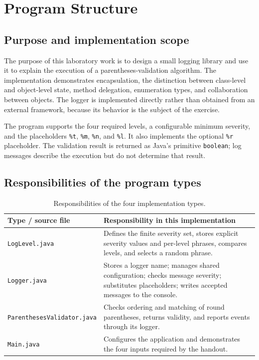 \documentclass[12pt,a4paper]{article}
\newcommand{\code}[1]{\texttt{#1}}
\begin{document}
\section{Program Structure}
\subsection{Purpose and implementation scope}
The purpose of this laboratory work is to design a small logging library and use it to explain the execution of a parentheses-validation algorithm. The implementation demonstrates encapsulation, the distinction between class-level and object-level state, method delegation, enumeration types, and collaboration between objects. The logger is implemented directly rather than obtained from an external framework, because its behavior is the subject of the exercise.

The program supports the four required levels, a configurable minimum severity, and the placeholders \code{\%t}, \code{\%m}, \code{\%n}, and \code{\%l}. It also implements the optional \code{\%r} placeholder. The validation result is returned as Java's primitive \code{boolean}; log messages describe the execution but do not determine that result.

\subsection{Responsibilities of the program types}
\begin{table}[H]
\centering\small
\begin{tabularx}{\textwidth}{@{}p{}Y@{}}
\toprule
\textbf{Type / source file} & \textbf{Responsibility in this implementation}\\
\midrule
\code{LogLevel.java} & Defines the finite severity set, stores explicit severity values and per-level phrases, compares levels, and selects a random phrase.\\
\code{Logger.java} & Stores a logger name; manages shared configuration; checks message severity; substitutes placeholders; writes accepted messages to the console.\\
\code{ParenthesesValidator.java} & Checks ordering and matching of round parentheses, returns validity, and reports events through its logger.\\
\code{Main.java} & Configures the application and demonstrates the four inputs required by the handout.\\
\bottomrule
\end{tabularx}
\caption{Responsibilities of the four implementation types.}
\end{table}
\end{document}
